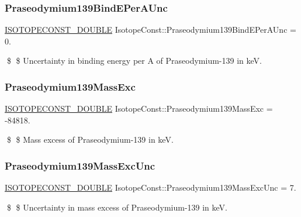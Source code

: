 \subsubsection{\texorpdfstring{Praseodymium139\+Bind\+E\+Per\+A\+Unc}{Praseodymium139BindEPerAUnc}}
{\footnotesize\ttfamily \mbox{\hyperlink{group___isotope_const-_macros_ga8f45a7272ce02c0b4c65c44636ed719a}{I\+S\+O\+T\+O\+P\+E\+C\+O\+N\+S\+T\+\_\+\+D\+O\+U\+B\+LE}} Isotope\+Const\+::\+Praseodymium139\+Bind\+E\+Per\+A\+Unc = 0.}

\$ \$ Uncertainty in binding energy per A of Praseodymium-\/139 in keV. \mbox{\label{group___isotope_const-_praseodymium-_pr139_ga40bb93d2b8d873d0b50d965f37d22656}} 
\subsubsection{\texorpdfstring{Praseodymium139\+Mass\+Exc}{Praseodymium139MassExc}}
{\footnotesize\ttfamily \mbox{\hyperlink{group___isotope_const-_macros_ga8f45a7272ce02c0b4c65c44636ed719a}{I\+S\+O\+T\+O\+P\+E\+C\+O\+N\+S\+T\+\_\+\+D\+O\+U\+B\+LE}} Isotope\+Const\+::\+Praseodymium139\+Mass\+Exc = -\/84818.}

\$ \$ Mass excess of Praseodymium-\/139 in keV. \mbox{\label{group___isotope_const-_praseodymium-_pr139_ga5c49b945affda294907d7e503464f205}} 
\subsubsection{\texorpdfstring{Praseodymium139\+Mass\+Exc\+Unc}{Praseodymium139MassExcUnc}}
{\footnotesize\ttfamily \mbox{\hyperlink{group___isotope_const-_macros_ga8f45a7272ce02c0b4c65c44636ed719a}{I\+S\+O\+T\+O\+P\+E\+C\+O\+N\+S\+T\+\_\+\+D\+O\+U\+B\+LE}} Isotope\+Const\+::\+Praseodymium139\+Mass\+Exc\+Unc = 7.}

\$ \$ Uncertainty in mass excess of Praseodymium-\/139 in keV. \mbox{\label{group___isotope_const-_praseodymium-_pr139_ga9f424441da53c911030f522df84c8784}} 
